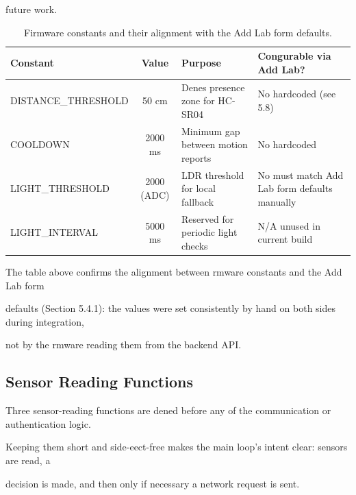 future work.

\begin{table}[htbp]
	\centering
	\caption{Firmware constants and their alignment with the Add Lab form defaults.}
	\label{tab:5-1}
	\begin{tabular}{lcll}
		\toprule
		Constant            & Value      & Purpose                            & Congurable via Add Lab?                       \\
		\midrule
		DISTANCE\_THRESHOLD & 50 cm      & Denes presence zone for HC-SR04    & No  hardcoded (see 5.8)                       \\
		COOLDOWN            & 2000 ms    & Minimum gap between motion reports & No  hardcoded                                 \\
		LIGHT\_THRESHOLD    & 2000 (ADC) & LDR threshold for local fallback   & No  must match Add Lab form defaults manually \\
		LIGHT\_INTERVAL     & 5000 ms    & Reserved for periodic light checks & N/A  unused in current build                  \\
		\bottomrule
	\end{tabular}
\end{table}

The table above confirms the alignment between rmware constants and the Add Lab form

defaults (Section 5.4.1): the values were set consistently by hand on both sides during integration,

not by the rmware reading them from the backend API.


\subsection{Sensor Reading Functions}
Three sensor-reading functions are dened before any of the communication or authentication logic.

Keeping them short and side-eect-free makes the main loop's intent clear: sensors are read, a

decision is made, and then  only if necessary  a network request is sent.

